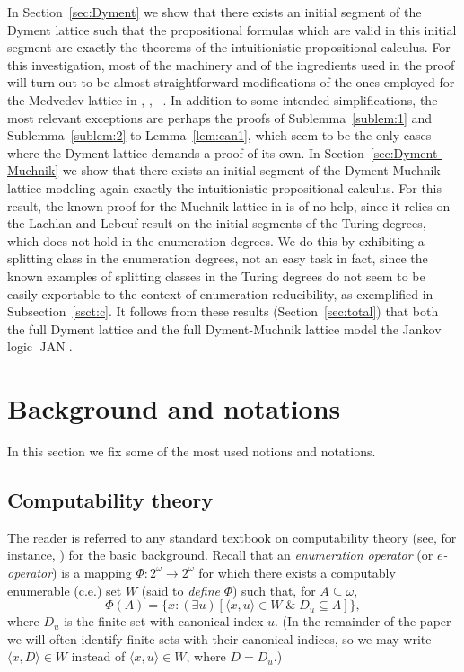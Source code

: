 \documentclass[11pt]{amsart}
\newcommand{\mathand}{\; \&  \;}
\newcommand{\JAN}{\operatorname{JAN}}
\begin{document}
In Section~\ref{sec:Dyment} we show that there exists an initial segment of 
the Dyment lattice such that the propositional formulas which are valid in 
this initial segment are exactly the theorems of the intuitionistic 
propositional calculus. For this investigation, most of the machinery and of 
the ingredients used in the proof will turn out to be almost straightforward 
modifications of the ones employed for the Medvedev lattice in 
\cite{Kuyper-Medvedev}, \cite{Skvortsova:intuitionism}, \ 
\cite{Sorbi:Embedding}. In addition to some intended simplifications, the 
most relevant exceptions are perhaps the proofs of Sublemma~\ref{sublem:1} 
and Sublemma~\ref{sublem:2} to Lemma~\ref{lem:can1}, which seem to be the 
only cases where the Dyment lattice demands a proof of its own. In 
Section~\ref{sec:Dyment-Muchnik} we show that there exists an initial segment 
of the Dyment-Muchnik lattice modeling again exactly the intuitionistic 
propositional calculus. For this result, the known proof for the Muchnik 
lattice in \cite{Sorbi-Terwijn:factors} is of no help, since it relies on the 
Lachlan and Lebeuf result on the initial segments of the Turing degrees, 
which does not hold in the enumeration degrees. We do this by exhibiting a 
splitting class in the enumeration degrees, not an easy task in fact, since 
the known examples of splitting classes in the Turing degrees do not seem to 
be easily exportable to the context of enumeration reducibility, as 
exemplified in Subsection~\ref{ssct:c}. It follows from these results 
(Section~\ref{sec:total}) that both the full Dyment lattice and the full 
Dyment-Muchnik lattice model the Jankov logic $\JAN$. 

\section{Background and notations}

In this section we fix some of the most used notions and notations.

\subsection{Computability theory}\label{ssct:comp}

The reader is referred to any standard textbook on computability theory (see, 
for instance, \cite{Cooper:Book, Rogers:Book, Soare:Book}) for the basic 
background. Recall that an \emph{enumeration operator} (or 
\emph{$e$-operator}) is a mapping $\Phi: 2^{\omega} \to 2^{\omega}$ for which 
there exists a computably enumerable (c.e.) set $W$ (said to \emph{define} 
$\Phi$) such that, for $A \subseteq \omega$, 
\[
\Phi(A)=\{x: (\exists u)[\langle x, u\rangle \in W 
                        \mathand D_{u} \subseteq A]\},
\]
where $D_{u}$ is the finite set with canonical index $u$. (In the remainder 
of the paper we will often identify finite sets with their canonical indices, 
so we may write $\langle x, D \rangle \in W$ instead of $\langle x, u \rangle 
\in W$, where $D = D_{u}$.) 
\end{document}
